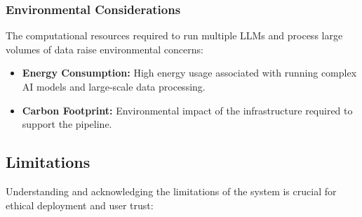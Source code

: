 
\subsubsection{Environmental Considerations}\label{subsubsec:environmental-considerations}
The computational resources required to run multiple LLMs and process large volumes of data raise environmental concerns:
\begin{itemize}
    \item \textbf{Energy Consumption:} High energy usage associated with running complex AI models and large-scale data processing.
    \item \textbf{Carbon Footprint:} Environmental impact of the infrastructure required to support the pipeline.
\end{itemize}


\subsection{Limitations}\label{subsec:limitations}
Understanding and acknowledging the limitations of the system is crucial for ethical deployment and user trust:

